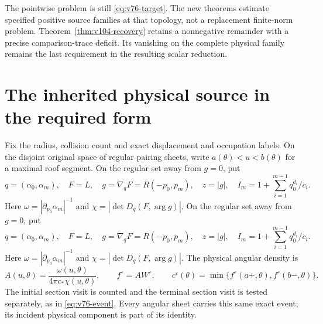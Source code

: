 \documentclass[11pt,reqno]{amsart}
\numberwithin{equation}{section}
\theoremstyle{definition}\newtheorem{definition}[theorem]{Definition}
\theoremstyle{remark}\newtheorem{remark}[theorem]{Remark}
\theoremstyle{definition}\newtheorem{inputstatement}[theorem]{Input statement}
\begin{document}
The pointwise problem is still \eqref{eq:v76-target}. The new
theorems estimate specified positive source families at that topology,
not a replacement finite-norm problem. Theorem~\ref{thm:v104-recovery}
retains a nonnegative remainder with a precise comparison-trace
deficit. Its vanishing on the complete physical family remains the
last requirement in the resulting scalar reduction.

\section{The inherited physical source in the required form}
Fix the radius, collision count and exact displacement and occupation
labels. On the disjoint original space of regular pairing sheets,
write $a(\theta)<u<b(\theta)$ for a maximal roof segment. On the regular set away from $g=0$, put
\[
 q=(\alpha_0,\alpha_m),\quad F=L,\quad
 g=\nabla_qF=R(-p_0,p_m),\quad z=|g|,\quad
 I_m=1+\sum_{i=1}^{m-1}q_0^{d_i}/c_i.
\]
Here $\omega=|\partial_{p_0}\alpha_m|^{-1}$ and
$\chi=|\det D_q(F,\arg g)|$. On the regular set away from $g=0$, put
\[
 q=(\alpha_0,\alpha_m),\quad F=L,\quad
 g=\nabla_qF=R(-p_0,p_m),\quad z=|g|,\quad
 I_m=1+\sum_{i=1}^{m-1}q_0^{d_i}/c_i.
\]
Here $\omega=|\partial_{p_0}\alpha_m|^{-1}$ and
$\chi=|\det D_q(F,\arg g)|$. The physical angular density is
\[
 A(u,\theta)=\frac{\omega(u,\theta)}{4\pi c_*\chi(u,\theta)},
 \qquad f^\varepsilon=A W^\varepsilon,
 \qquad c^\varepsilon(\theta)
     =\min\{f^\varepsilon(a+,\theta),f^\varepsilon(b-,\theta)\}.
\]
The initial section visit is counted and the terminal section visit
is tested separately, as in \eqref{eq:v76-event}. Every angular
sheet carries this same exact event; its incident physical component
is part of its identity.
\end{document}
